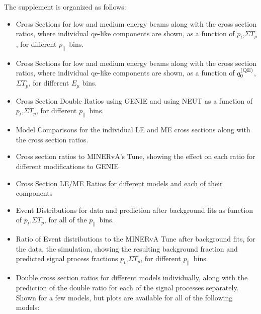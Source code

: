 \documentclass[aps,prl,twocolumn,showpacs,superscriptaddress, floatfix,10pt]{revtex4-2}
\newcommand{\pt}{\ensuremath{p_{t}}}
\newcommand{\pz}{\ensuremath{p_{||}}}
\newcommand{\sumtp}{\ensuremath{\Sigma T_{p}}}
\newcommand{\qzeroqe}{\ensuremath{q_{0}^{\rm\scriptstyle (QE)}}}
\begin{document}
The supplement is organized as follows:  
\begin{itemize}
\item Cross Sections for low and medium energy beams along with the cross section ratios, where individual qe-like components are shown, as a function of \pt,\sumtp, for different \pz\ bins. 
\item Cross Sections for low and medium energy beams along with the cross section ratios, where individual qe-like components are shown, as a function of \qzeroqe,\sumtp, for different $E_\mu$ bins. 
\item Cross Section Double Ratios using GENIE and using NEUT as a function of \pt,\sumtp, for different \pz\ bins.
\item Model Comparisons for the individual LE and ME cross sections along with the cross section ratios.
\item Cross section ratios to MINERvA's Tune, showing the effect on each ratio for different modifications to GENIE
\item Cross Section LE/ME Ratios for different models and each of their components
\item Event Distributions for data and prediction after background fits as function of \pt,\sumtp, for all of the \pz\ bins.  
\item Ratio of Event distributions to the MINERvA Tune after background fits, for the data, the simulation, showing the resulting background fraction and predicted signal process fractions \pt,\sumtp, for different \pz\ bins.
\item Double cross section ratios for different models individually, along with the prediction of the double ratio for each of the signal processes separately.  Shown for a few models, but plots are available for all of the following models: 
\end{itemize}

\clearpage
\FloatBarrier

\setcounter{figure}{109}
\end{document}
